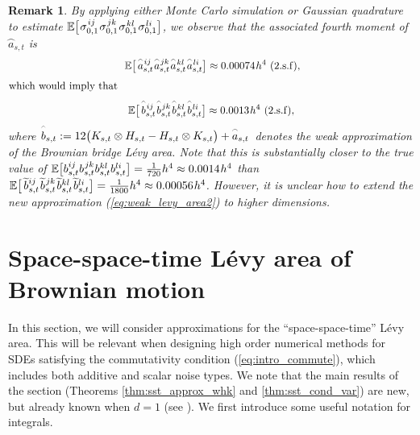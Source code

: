 \documentclass[sn-mathphys-num]{sn-jnl}%
\newtheorem{remark}{Remark}%
\newcommand{\E}{\mathbb{E}}
\newcommand{\m}{\hspace{0.25mm}}
\begin{document}
\begin{remark}
By applying either Monte Carlo simulation or Gaussian quadrature to estimate $\E\big[\m\sigma_{0,1}^{\m ij}\m\sigma_{0,1}^{\m jk}\m\sigma_{0,1}^{\m kl}\m\sigma_{0,1}^{\m li}\big]$, we observe that the associated fourth moment of $\wideparen{a}_{s,t}$ is
\begin{align*}
& \,\,\E\big[\,\wideparen{a}_{s,t}^{\m ij}\m\wideparen{a}_{s,t}^{\m jk}\m\wideparen{a}_{s,t}^{\m kl}\m\wideparen{a}_{s,t}^{\m li}\big] \approx 0.00074\m h^4\,\,(\text{2.s.f}\m),\\[3pt]
\text{which would imply that } &\\[3pt]
&\,\,\,\,\E\big[\,\wideparen{b}_{s,t}^{\m ij}\m\wideparen{b}_{s,t}^{\m jk}\m\wideparen{b}_{s,t}^{\m kl}\m\wideparen{b}_{s,t}^{\m li}\big] \approx 0.0013\m h^4\,\,(\text{2.s.f}\m),\hspace*{40mm}
\end{align*}
where $\wideparen{b}_{s,t} := 12\big(K_{s,t}\otimes H_{s,t} - H_{s,t}\otimes K_{s,t}\big) + \wideparen{a}_{s,t}\m$ denotes the weak approximation of the Brownian bridge L\'{e}vy area. Note that this is substantially closer to the true value of\vspace{0.5mm} $\E\big[b_{s,t}^{ij}b_{s,t}^{\m jk}b_{s,t}^{kl}b_{s,t}^{li}\big] = \frac{1}{720}h^4 \approx 0.0014\m h^4$ than $\m\E\big[\,\widetilde{b}_{s,t}^{ij}\m\widetilde{b}_{s,t}^{\m jk}\m\widetilde{b}_{s,t}^{kl}\m\widetilde{b}_{s,t}^{li}\big] = \frac{1}{1800}h^4\approx 0.00056\m h^4$.\vspace{0.5mm} However, it is unclear how to extend the new approximation (\ref{eq:weak_levy_area2}) to higher dimensions.
\end{remark}

\section{Space-space-time L\'{e}vy area of Brownian motion}\label{sect:space_space_time}

In this section, we will consider approximations for the ``space-space-time'' L\'{e}vy area.
This will be relevant when designing high order numerical methods for SDEs satisfying the commutativity condition (\ref{eq:intro_commute}), which includes both additive and scalar noise types.
We note that the main results of the section (Theorems \ref{thm:sst_approx_whk} and \ref{thm:sst_cond_var}) are new, but already known when $d=1$ (see \cite{foster2020poly, foster2020thesis}). We first introduce some useful notation for integrals.
\end{document}
